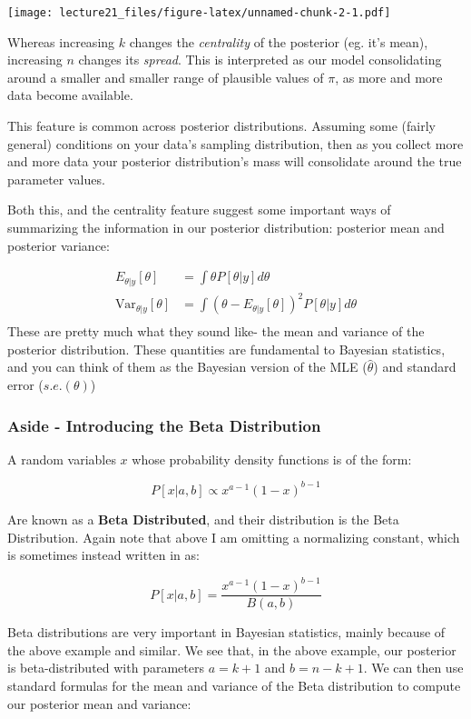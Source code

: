 \documentclass[
]{article}
\begin{document}
\texttt{[image: lecture21\_files/figure-latex/unnamed-chunk-2-1.pdf]}

Whereas increasing \(k\) changes the \emph{centrality} of the posterior
(eg. it's mean), increasing \(n\) changes its \emph{spread}. This is
interpreted as our model consolidating around a smaller and smaller
range of plausible values of \(\pi\), as more and more data become
available.

This feature is common across posterior distributions. Assuming some
(fairly general) conditions on your data's sampling distribution, then
as you collect more and more data your posterior distribution's mass
will consolidate around the true parameter values.

Both this, and the centrality feature suggest some important ways of
summarizing the information in our posterior distribution: posterior
mean and posterior variance:

\[
\begin{split}
E_{\theta|y}[\theta] &= \int \theta P[\theta|y] d\theta\\
\text{Var}_{\theta|y}[\theta]&= \int (\theta -E_{\theta|y}[\theta] )^2 P[\theta|y] d\theta\\
\end{split}
\] These are pretty much what they sound like- the mean and variance of
the posterior distribution. These quantities are fundamental to Bayesian
statistics, and you can think of them as the Bayesian version of the MLE
(\(\hat \theta\)) and standard error (\(s.e.(\theta)\))

\hypertarget{aside---introducing-the-beta-distribution}{%
\subsubsection{Aside - Introducing the Beta
Distribution}\label{aside---introducing-the-beta-distribution}}

A random variables \(x\) whose probability density functions is of the
form:

\[
P[x|a,b] \propto x^{a-1}(1-x)^{b-1}
\]

Are known as a \textbf{Beta Distributed}, and their distribution is the
Beta Distribution. Again note that above I am omitting a normalizing
constant, which is sometimes instead written in as:

\[
P[x|a,b] = \frac{ x^{a-1}(1-x)^{b-1} } {B(a,b)}
\]

Beta distributions are very important in Bayesian statistics, mainly
because of the above example and similar. We see that, in the above
example, our posterior is beta-distributed with parameters \(a=k+1\) and
\(b=n-k+1\). We can then use standard formulas for the mean and variance
of the Beta distribution to compute our posterior mean and variance:
\end{document}
